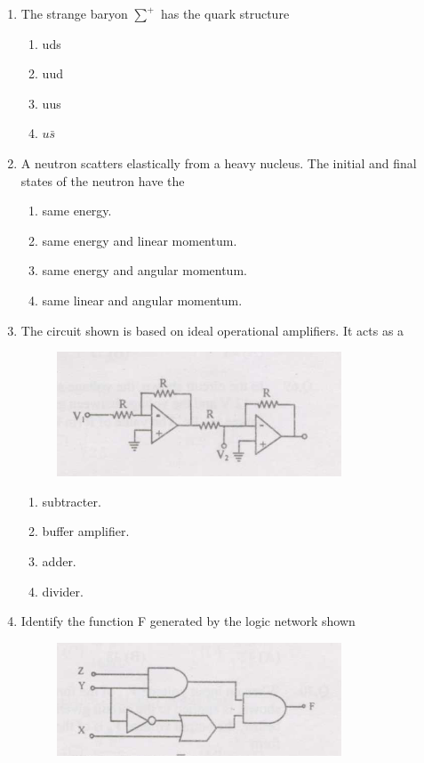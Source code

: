 \documentclass[journal]{IEEEtran}
\numberwithin{equation}{enumi}
\numberwithin{figure}{enumi}
\begin{document}
\begin{enumerate}
\begin{enumerate}
		\end{enumerate}
	\item The strange baryon $\sum^+$ has the quark structure
		\begin{enumerate}
			\item uds
			\item uud
			\item uus
			\item $u\bar{s}$
		\end{enumerate}
	\item A neutron scatters elastically from a heavy nucleus. The initial and final states of the neutron have the
		\begin{enumerate}
			\item same energy.
			\item same energy and linear momentum.
			\item same energy and angular momentum.
			\item same linear and angular momentum.
		\end{enumerate}
	\item The circuit shown is based on ideal operational amplifiers. It acts as a
		\begin{figure}[H]
                        \centering
                        \includegraphics[width=0.4\linewidth]{figs/fig2.png}
                        \caption{}
                        \label{graph}
                \end{figure}
		\begin{enumerate}
			\item subtracter.
			\item buffer amplifier.
			\item adder.
			\item divider.
		\end{enumerate}
	\item Identify the function F generated by the logic network shown
		\begin{figure}[H]
                        \centering
                        \includegraphics[width=0.4\linewidth]{figs/fig3.png}

\end{figure}
\end{enumerate}
\end{document}
